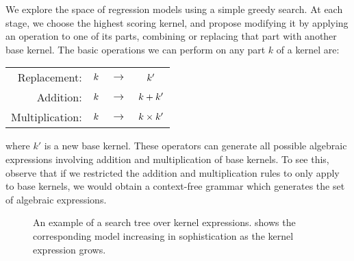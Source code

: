 We explore the space of regression models using a simple greedy search.
At each stage, we choose the highest scoring kernel, and propose modifying it by applying an operation to one of its parts, combining or replacing that part with another base kernel.
The basic operations we can perform on any part $k$ of a kernel are:
%
\begin{center}
\begin{tabular}{rccc}
\textnormal{Replacement:}    & $k$ & $\to$ & $k'$\\
\textnormal{Addition:}       & $k$ & $\to$ & $k + k'$\\
\textnormal{Multiplication:} & $k$ &  $\to$ & $k \times k'$\\
\end{tabular}
\end{center}
%
where $k'$ is a new base kernel.
These operators can generate all possible algebraic expressions involving addition and multiplication of base kernels.
To see this, observe that if we restricted the addition and multiplication rules to only apply to base kernels, we would obtain a context-free grammar which generates the set of algebraic expressions.

\begin{figure}
\centering
\newcommand{\treescale}{*1.5\columnwidth}
\caption[A search tree over kernels]{An example of a search tree over kernel expressions.
 shows the corresponding model increasing in sophistication as the kernel expression grows.
}
\label{fig:mauna_search_tree}
\end{figure}

